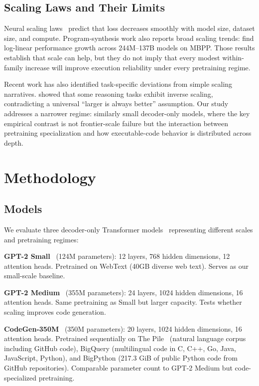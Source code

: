 \documentclass[preprint,12pt,authoryear]{elsarticle}
\begin{document}
\subsection{Scaling Laws and Their Limits}

Neural scaling laws~\cite{kaplan2020scaling,hoffmann2022training} predict that loss decreases smoothly with model size, dataset size, and compute. Program-synthesis work also reports broad scaling trends: \citet{austin2021program} find log-linear performance growth across 244M--137B models on MBPP. Those results establish that scale can help, but they do not imply that every modest within-family increase will improve execution reliability under every pretraining regime.

Recent work has also identified task-specific deviations from simple scaling narratives. \citet{wei2022emergent} showed that some reasoning tasks exhibit inverse scaling, contradicting a universal ``larger is always better'' assumption. Our study addresses a narrower regime: similarly small decoder-only models, where the key empirical contrast is not frontier-scale failure but the interaction between pretraining specialization and how executable-code behavior is distributed across depth.

\section{Methodology}

\subsection{Models}

We evaluate three decoder-only Transformer models~\cite{vaswani2017attention} representing different scales and pretraining regimes:

\textbf{GPT-2 Small}~\cite{radford2019language} (124M parameters): 12 layers, 768 hidden dimensions, 12 attention heads. Pretrained on WebText (40GB diverse web text). Serves as our small-scale baseline.

\textbf{GPT-2 Medium}~\cite{radford2019language} (355M parameters): 24 layers, 1024 hidden dimensions, 16 attention heads. Same pretraining as Small but larger capacity. Tests whether scaling improves code generation.

\textbf{CodeGen-350M}~\cite{nijkamp2022codegen} (350M parameters): 20 layers, 1024 hidden dimensions, 16 attention heads. Pretrained sequentially on The Pile~\cite{gao2021pile} (natural language corpus including GitHub code), BigQuery (multilingual code in C, C++, Go, Java, JavaScript, Python), and BigPython (217.3 GiB of public Python code from GitHub repositories). Comparable parameter count to GPT-2 Medium but code-specialized pretraining.
\end{document}
